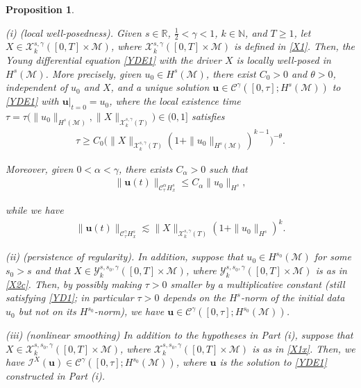 \documentclass[letterpaper, 11pt,  reqno]{amsart}
\newtheorem{proposition}[theorem]{Proposition}
\newcommand{\1}{\hspace{0.5mm}\text{I}\hspace{0.5mm}}
\newcommand{\I}{\mathcal{I}}
\newcommand{\noi}{\noindent}
\newcommand{\R}{\mathbb{R}}
\newcommand{\CC}{\mathcal{C}}
\newcommand{\al}{\alpha}
\newcommand{\g}{\gamma}
\newcommand{\ta}{\theta}
\newcommand{\les}{\lesssim}
\newcommand{\M}{\mathcal{M}}
\newcommand{\N}{\mathbb{N}}
\newcommand{\cC}{\mathcal{C}}
\newcommand{\cX}{\mathcal{X}}
\newcommand{\cY}{\mathcal{Y}}
\newcommand{\uu}{\mathbf{u}}
\numberwithin{equation}{section}
\numberwithin{theorem}{section}
\begin{document}
\begin{proposition}
\label{PROP:main}

\textup{(i) (local well-posedness).}
Given   $s \in \R$, $\frac 12 < \g < 1$,  $k \in \N$, and $T \ge 1$, 
let     $X \in \cX^{s, \g}_k([0, T]\times \M)$, 
where $ \cX^{s, \g}_k([0, T]\times \M)$ is  defined  in \eqref{X1}.
Then, 
 the Young differential equation \eqref{YDE1} with 
 the driver $X$ 
is locally well-posed in $H^s(\M)$.
More precisely, given  $u_0\in H^s(\M)$, 
there exist $C_0 >0$ and   $\ta>0$, independent of $u_0$ and $X$, 
and 
 a unique solution $\uu \in \cC^\g([0, \tau]; H^s(\M))$
   to 
 \eqref{YDE1}  
with $\uu|_{t= 0} = u_0$, where the local existence time $\tau = 
\tau\big(\|u_0\|_{H^s(\M)}, \|X\|_{\cX^{s, \g}_k(T)}\big) \in (0, 1]$
satisfies 
\begin{align}
\tau \ge  C_0 
\Big(\|X\|_{\cX^{s,\g}_k(T)}  (1+ \|u_0\|_{H^s(\M)})^{k-1}\Big)^{-\ta}.
\label{YD1}
\end{align}

\noi
Moreover, given $0 < \al < \g$, 
there exists $C_\al > 0$ 
such that 
\begin{align}
\| \uu(t) \|_{\CC^\al_\tau H^s_x}\le C_\al \|u_0\|_{H^s}, 
\label{YD1a}
\end{align}


\noi
while we have
\begin{align}
\| \uu(t) \|_{\CC^\g_\tau H^s_x}\les \|X\|_{\cX^{s,\g}_k(T)}  (1+\|u_0\|_{H^s})^k.
\label{YD1b}
\end{align}



\smallskip

\noi
\textup{(ii) (persistence of regularity).}
In addition, suppose that $u_0 \in H^{s_0}(\M)$ for some $s_0 > s$
and that  $X \in \cY^{s, s_0, \g}_k([0, T]\times \M)$, 
where $\cY^{s, s_0, \g}_k([0, T]\times \M)$  is  as in \eqref{X2c}.
Then, 
by possibly making $\tau > 0$ smaller by a multiplicative constant 
\textup{(}still satisfying \eqref{YD1}\textup{;} in particular $\tau > 0$
depends on the $H^s$-norm of the initial data $u_0$
but not on its $H^{s_0}$-norm\textup{)}, 
we have $\uu \in \cC^\g([0, \tau]; H^{s_0}(\M))$.


\smallskip

\noi
\textup{(iii) (nonlinear smoothing)}
In addition to the hypotheses in Part (i), 
suppose  that  $X \in \cX^{s, s_0, \g}_k([0, T]\times \M)$, 
where $\cX^{s, s_0, \g}_k([0, T]\times \M)$  is  as in \eqref{X1x}.
Then, we have
 $\I^X(\uu) \in \cC^\g([0, \tau]; H^{s_0}(\M))$, 
 where $\uu$ is the solution to \eqref{YDE1}
 constructed in Part (i).





\end{proposition}
\end{document}
